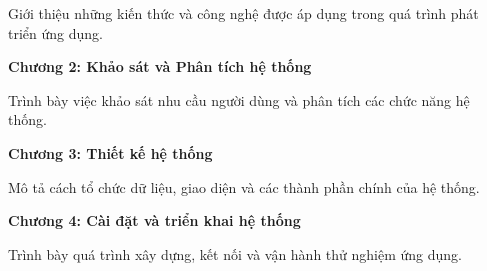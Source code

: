 Giới thiệu những kiến thức và công nghệ được áp dụng trong quá trình phát triển ứng dụng.

\vspace{0.25cm}

\noindent\textbf{Chương 2: Khảo sát và Phân tích hệ thống}

Trình bày việc khảo sát nhu cầu người dùng và phân tích các chức năng hệ thống.

\vspace{0.25cm}

\noindent\textbf{Chương 3: Thiết kế hệ thống}

Mô tả cách tổ chức dữ liệu, giao diện và các thành phần chính của hệ thống.

\vspace{0.25cm}

\noindent\textbf{Chương 4: Cài đặt và triển khai hệ thống}

Trình bày quá trình xây dựng, kết nối và vận hành thử nghiệm ứng dụng.
